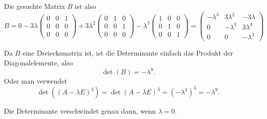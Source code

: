\begin{loesung}
\begin{teilaufgaben}
\begin{align*}
\\
\end{align*}
Die gesuchte Matrix $B$ ist also
\[
B=0 -3\lambda \begin{pmatrix}
0&0&1\\
0&0&0\\
0&0&0
\end{pmatrix}
+3\lambda^2
\begin{pmatrix}
0&1&0\\
0&0&1\\
0&0&0
\end{pmatrix}
-\lambda^3\begin{pmatrix}1&0&0\\0&1&0\\0&0&1\end{pmatrix}
=\begin{pmatrix}
-\lambda^3& 3\lambda^2&-3\lambda\\
         0&- \lambda^3&3\lambda^3\\
         0&          0&- \lambda^3
\end{pmatrix}
\]
\item
Da $B$ eine Dreiecksmatrix ist, ist die Determinante einfach das Produkt
der Diagonalelemente, also
\[
\det(B)=-\lambda^9.
\]
Oder man verwendet
\[
\det((A-\lambda E)^3)
=
\det(A-\lambda E)^3=(-\lambda^3)^3=-\lambda^9.
\]
\item Die Determinante verschwindet genau dann, wenn $\lambda=0$.
\qedhere
\end{teilaufgaben}
\end{loesung}

